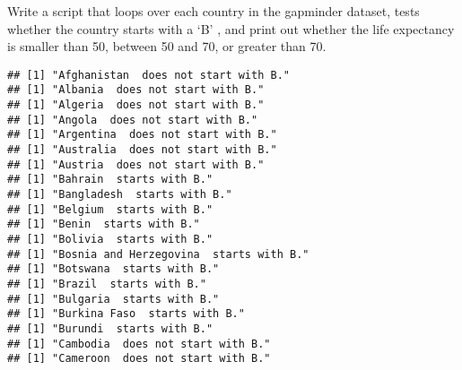 \documentclass[
]{article}
\newenvironment{Shaded}{\begin{snugshade}}{\end{snugshade}}
\newcommand{\CommentTok}[1]{\textcolor[rgb]{0.56,0.35,0.01}{\textit{#1}}}
\newcommand{\ControlFlowTok}[1]{\textcolor[rgb]{0.13,0.29,0.53}{\textbf{#1}}}
\newcommand{\DataTypeTok}[1]{\textcolor[rgb]{0.13,0.29,0.53}{#1}}
\newcommand{\DecValTok}[1]{\textcolor[rgb]{0.00,0.00,0.81}{#1}}
\newcommand{\KeywordTok}[1]{\textcolor[rgb]{0.13,0.29,0.53}{\textbf{#1}}}
\newcommand{\NormalTok}[1]{#1}
\newcommand{\OperatorTok}[1]{\textcolor[rgb]{0.81,0.36,0.00}{\textbf{#1}}}
\newcommand{\OtherTok}[1]{\textcolor[rgb]{0.56,0.35,0.01}{#1}}
\newcommand{\StringTok}[1]{\textcolor[rgb]{0.31,0.60,0.02}{#1}}
\begin{document}
Write a script that loops over each country in the gapminder dataset,
tests whether the country starts with a `B' , and print out whether the
life expectancy is smaller than 50, between 50 and 70, or greater than
70.

\begin{Shaded}
\end{Shaded}

\begin{verbatim}
## [1] "Afghanistan  does not start with B."
## [1] "Albania  does not start with B."
## [1] "Algeria  does not start with B."
## [1] "Angola  does not start with B."
## [1] "Argentina  does not start with B."
## [1] "Australia  does not start with B."
## [1] "Austria  does not start with B."
## [1] "Bahrain  starts with B."
## [1] "Bangladesh  starts with B."
## [1] "Belgium  starts with B."
## [1] "Benin  starts with B."
## [1] "Bolivia  starts with B."
## [1] "Bosnia and Herzegovina  starts with B."
## [1] "Botswana  starts with B."
## [1] "Brazil  starts with B."
## [1] "Bulgaria  starts with B."
## [1] "Burkina Faso  starts with B."
## [1] "Burundi  starts with B."
## [1] "Cambodia  does not start with B."
## [1] "Cameroon  does not start with B."
\end{verbatim}
\end{document}
